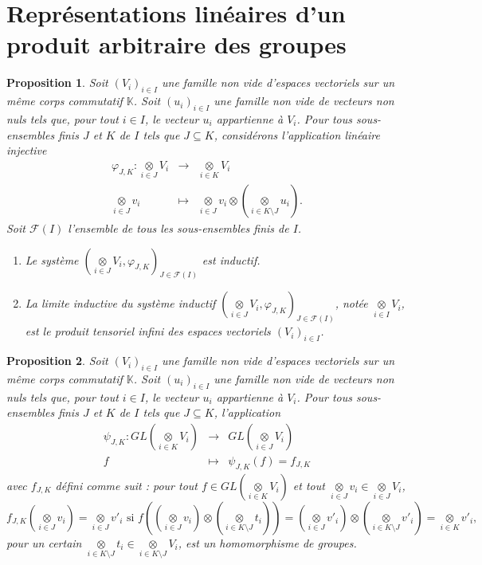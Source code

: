 \documentclass[9pt]{beamer}
\newtheorem{proposition}{Proposition}
\begin{document}
\section{Représentations linéaires d'un produit arbitraire des groupes}

\begin{frame}
\begin{proposition}
Soit $(V_i)_{i\in I}$ une famille non vide d’espaces vectoriels sur un même corps commutatif  $\mathbb{K}$. Soit $(u_i)_{i\in I}$ une famille non vide de vecteurs non nuls tels que, pour tout $i\in I$, le vecteur $u_i$ appartienne à $V_i$. Pour tous sous-ensembles finis $J$ et $K$ de $I$ tels que $J\subseteq K$, considérons l'application linéaire injective  
	$$\begin{array}{rlll}
		\varphi_{J,K}: \underset{i\in J}\otimes V_i& \longrightarrow& \underset{i\in K}\otimes V_i\\
		\underset{i\in J}\otimes v_i&\longmapsto& \underset{i\in J}\otimes v_i\otimes(\underset{i\in K\setminus J}\otimes u_i).
	\end{array}
	$$
	Soit $\mathcal{F}(I)$ l'ensemble de tous les sous-ensembles finis de $I$. 
	\begin{enumerate}[label=\roman*)]
		\item Le système $(\underset{i\in J}\otimes V_i, \varphi_{J,K})_{J\in \mathcal{F}(I)}$ est inductif.
		\item La limite inductive du système inductif $(\underset{i\in J}\otimes V_i, \varphi_{J,K})_{J\in \mathcal{F}(I)}$, notée $\underset{i\in I}\otimes V_i$, est le produit tensoriel infini des espaces vectoriels $(V_i)_{i\in I}$.
	\end{enumerate}
\end{proposition}
\end{frame}


\begin{frame}
\begin{proposition}
Soit $(V_i)_{i\in I}$ une famille non vide d’espaces vectoriels sur un même corps commutatif  $\mathbb{K}$. Soit $(u_i)_{i\in I}$ une famille non vide de vecteurs non nuls tels que, pour tout $i\in I$, le vecteur $u_i$ appartienne à $V_i$. Pour tous sous-ensembles finis $J$ et $K$ de $I$ tels que $J\subseteq K$, l’application  
	$$\begin{array}{rlll}
		\psi_{J,K}: GL(\underset{i\in K}\otimes V_i)& \longrightarrow& GL(\underset{i\in J}\otimes V_i)\\
		f&\longmapsto& \psi_{J,K} (f)= f_{J,K}
	\end{array}
	$$ 
	avec $f_{J,K}$ défini comme suit : pour tout $f\in GL(\underset{i\in K}\otimes V_i)$ et tout $\underset{i\in J}\otimes v_i\in \underset{i\in J}\otimes V_i$,  
	$$f_{J,K}(\underset{i\in J}\otimes v_i)= \underset{i\in J}\otimes v'_i \text{ si } f((\underset{i\in J}\otimes v_i)\otimes (\underset{i\in K\setminus J}\otimes t_i))= (\underset{i\in J}\otimes v'_i)\otimes (\underset{i\in K\setminus J}\otimes v'_i)= \underset{i\in K}\otimes v'_i,$$  
	pour un certain $\underset{i\in K\setminus J}\otimes t_i\in \underset{i\in K\setminus J}\otimes V_i$, est un homomorphisme de groupes.
\end{proposition}
\end{frame}
\end{document}
